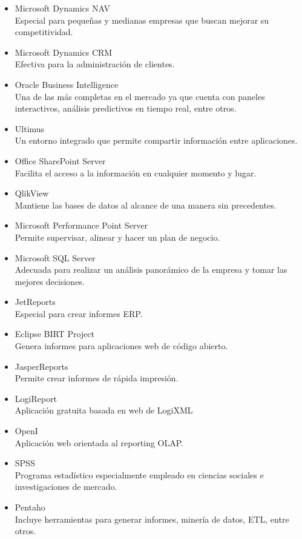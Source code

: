 \documentclass[%
 reprint,
 amsmath,amssymb,
 aps,
]{revtex4-1}
\begin{document}
\begin{itemize}
\item Microsoft Dynamics NAV\\
Especial para pequeñas y medianas empresas que buscan mejorar su competitividad.
\item  Microsoft Dynamics CRM\\
Efectiva para la administración de clientes.
\item Oracle Business Intelligence\\
Una de las más completas en el mercado ya que cuenta con paneles interactivos, análisis predictivos en tiempo real, entre otros.
\item Ultimus\\
Un entorno integrado que permite compartir información entre aplicaciones.
\item  Office SharePoint Server\\
Facilita el acceso a la información en cualquier momento y lugar.
\item QlikView\\
Mantiene las bases de datos al alcance de una manera sin precedentes.
\item Microsoft Performance Point Server\\
Permite supervisar, alinear y hacer un plan de negocio.
\item  Microsoft SQL Server\\
Adecuada para realizar un análisis panorámico de la empresa y tomar las mejores decisiones.
\item  JetReports\\
Especial para crear informes ERP.
\item Eclipse BIRT Project\\
Genera informes para aplicaciones web de código abierto.
\item  JasperReports\\
Permite crear informes de rápida impresión.
\item  LogiReport\\
Aplicación gratuita basada en web de LogiXML
\item OpenI\\
Aplicación web orientada al reporting OLAP.
\item  SPSS\\
Programa estadístico especialmente empleado en ciencias sociales e investigaciones de mercado.
\item  Pentaho\\
Incluye herramientas para generar informes, minería de datos, ETL, entre otros.

\end{itemize}
\end{document}
